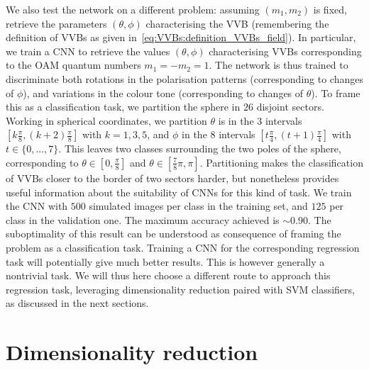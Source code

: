 
We also test the network on a different problem: assuming $(m_1,m_2)$ is fixed, retrieve the parameters $(\theta,\phi)$ characterising the VVB (remembering the definition of VVBs as given in~\cref{eq:VVBs:definition_VVBs_field}).
In particular, we train a CNN to retrieve the values $(\theta,\phi)$ characterising VVBs corresponding to the OAM quantum numbers $m_1=-m_2=1$.
The network is thus trained to discriminate both rotations in the polarisation patterns (corresponding to changes of $\phi$), and variations in the colour tone (corresponding to changes of $\theta$).
To frame this as a classification task, we partition the sphere in $26$ disjoint sectors.
Working in spherical coordinates, we partition $\theta$ is in the $3$ intervals $\left[k \frac{\pi}{8}, (k+2) \frac{\pi}{8}\right]$ with $k=1,3,5$, and $\phi$ in the $8$ intervals $\left[t \frac{\pi}{4}, (t+1) \frac{\pi}{4}\right]$ with $t \in \{0,...,7\}$.
This leaves two classes surrounding the two poles of the sphere, corresponding to $\theta \in \left[0, \frac{\pi}{8}\right]$ and $\theta\in\left[ \frac{7}{8} \pi, \pi\right]$.
Partitioning makes the classification of VVBs closer to the border of two sectors harder, but nonetheless provides useful information about the suitability of CNNs for this kind of task.
We train the CNN with $500$ simulated images per class in the training set, and $125$ per class in the validation one. The maximum accuracy  achieved is $\sim 0.90$.
The suboptimality of this result can be understood as consequence of framing the problem as a classification task. Training a CNN for the corresponding regression task will potentially give much better results. This is however generally a nontrivial task. We will thus here choose a different route to approach this regression task, leveraging dimensionality reduction paired with SVM classifiers, as discussed in the next sections.


\section{Dimensionality reduction}
\label{sec:VVBs:dimensionality_reduction}

